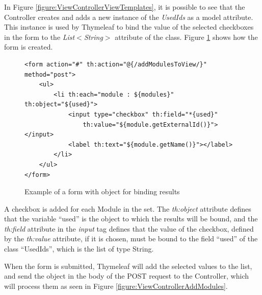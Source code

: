 In Figure \ref{figure:ViewControllerViewTemplates}, it is possible to see that the Controller creates and adds a new instance of the \textit{UsedIds} as a model attribute. This instance is used by Thymeleaf to bind the value of the selected checkboxes in the form to the \textit{List$<$String$>$} attribute of the class. Figure \ref{figure:viewFormBindingResult} shows how the form is created.
\begin{figure}[h]
\lstset{style=customhtml}
\begin{lstlisting}
<form action="#" th:action="@{/addModulesToView/}" method="post">
	<ul>
		<li th:each="module : ${modules}" th:object="${used}">
			<input type="checkbox" th:field="*{used}" 
				th:value="${module.getExternalId()}"></input>
			<label th:text="${module.getName()}"></label>
		</li>
	</ul>
</form>
\end{lstlisting}
\caption{Example of a form with object for binding results}
\label{figure:viewFormBindingResult}
\end{figure}
A checkbox is added for each Module in the set. The \textit{th:object} attribute defines that the variable ``used'' is the object to which the results will be bound, and the \textit{th:field} attribute in the \textit{input} tag defines that the value of the checkbox, defined by the \textit{th:value} attribute, if it is chosen, must be bound to the field ``used'' of the class ``UsedIds'', which is the list of type String.

When the form is submitted, Thymeleaf will add the selected values to the list, and send the object in the body of the POST request to the Controller, which will process them as seen in Figure \ref{figure:ViewControllerAddModules}.
					
					













